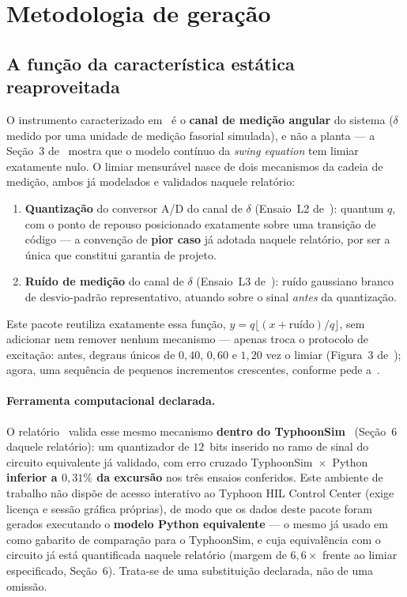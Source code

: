 \section{Metodologia de geração}
\label{sec:metodologia}

\subsection*{A função da característica estática reaproveitada}

O instrumento caracterizado em~\cite{limiarv1} é o \textbf{canal de medição angular} do sistema
($\delta$ medido por uma unidade de medição fasorial simulada), e não a planta --- a Seção~3
de~\cite{limiarv1} mostra que o modelo contínuo da \emph{swing equation} tem limiar exatamente
nulo. O limiar mensurável nasce de dois mecanismos da cadeia de medição, ambos já modelados e
validados naquele relatório:

\begin{enumerate}[leftmargin=1.6em]
\item \textbf{Quantização} do conversor A/D do canal de $\delta$ (Ensaio~L2 de~\cite{limiarv1}):
      quantum $q$, com o ponto de repouso posicionado exatamente sobre uma transição de código
      --- a convenção de \textbf{pior caso} já adotada naquele relatório, por ser a única que
      constitui garantia de projeto.
\item \textbf{Ruído de medição} do canal de $\delta$ (Ensaio~L3 de~\cite{limiarv1}): ruído
      gaussiano branco de desvio-padrão representativo, atuando sobre o sinal \emph{antes} da
      quantização.
\end{enumerate}

Este pacote reutiliza exatamente essa função,
$y = q\lfloor (x+\text{ruído})/q\rfloor$, sem adicionar nem remover nenhum mecanismo --- apenas
troca o protocolo de excitação: antes, degraus únicos de $0{,}40$, $0{,}60$ e $1{,}20$ vez o
limiar (Figura~3 de~\cite{limiarv1}); agora, uma sequência de pequenos incrementos crescentes,
conforme pede a~\cite{orientacao2026}.

\paragraph{Ferramenta computacional declarada.} O relatório~\cite{limiarv1} valida esse mesmo
mecanismo \textbf{dentro do TyphoonSim}~\cite{typhoon} (Seção~6 daquele relatório): um
quantizador de $12$~bits inserido no ramo de sinal do circuito equivalente já validado, com erro
cruzado TyphoonSim~$\times$~Python \textbf{inferior a $0{,}31\%$ da excursão} nos três ensaios
conferidos. Este ambiente de trabalho não dispõe de acesso interativo ao Typhoon HIL Control
Center (exige licença e sessão gráfica próprias), de modo que os dados deste pacote foram
gerados executando o \textbf{modelo Python equivalente} --- o mesmo já usado
em~\cite{limiarv1} como gabarito de comparação para o TyphoonSim, e cuja equivalência com o
circuito já está quantificada naquele relatório (margem de $6{,}6\times$ frente ao limiar
especificado, Seção~6). Trata-se de uma substituição declarada, não de uma omissão.

